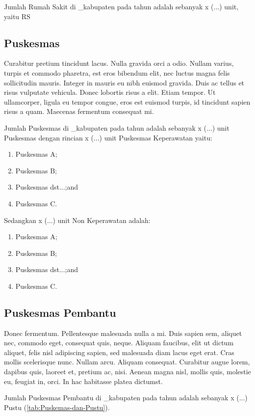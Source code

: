 Jumlah Rumah Sakit di \nama_kabupaten pada tahun \tP adalah
sebanyak x (...) unit, yaitu RS

\subsection{Puskesmas}
Curabitur pretium tincidunt lacus. Nulla gravida orci a odio. Nullam varius, turpis et commodo pharetra, est eros bibendum elit, nec luctus magna felis sollicitudin mauris. Integer in mauris eu nibh euismod gravida. Duis ac tellus et risus vulputate vehicula. Donec lobortis risus a elit. Etiam tempor. Ut ullamcorper, ligula eu tempor congue, eros est euismod turpis, id tincidunt sapien risus a quam. Maecenas fermentum consequat mi.

Jumlah Puskesmas di \nama_kabupaten pada tahun
\tP adalah sebanyak x (...) unit Puskesmas dengan rincian x (...)
unit Puskesmas Keperawatan yaitu:
\begin{enumerate}
  \item Puskesmas A;
  \item Puskesmas B;
  \item Puskesmas dst...;and
  \item Puskesmas C.
\end{enumerate}
Sedangkan x (...) unit Non Keperawatan adalah:
\begin{enumerate}
  \item Puskesmas A;
  \item Puskesmas B;
  \item Puskesmas dst...;and
  \item Puskesmas C.
\end{enumerate}

\subsection{Puskesmas Pembantu}

Donec fermentum. Pellentesque malesuada nulla a mi. Duis sapien sem, aliquet nec, commodo eget, consequat quis, neque. Aliquam faucibus, elit ut dictum aliquet, felis nisl adipiscing sapien, sed malesuada diam lacus eget erat. Cras mollis scelerisque nunc. Nullam arcu. Aliquam consequat. Curabitur augue lorem, dapibus quis, laoreet et, pretium ac, nisi. Aenean magna nisl, mollis quis, molestie eu, feugiat in, orci. In hac habitasse platea dictumst.

Jumlah Puskesmas Pembantu di \nama_kabupaten pada tahun \tP
adalah sebanyak x (...) Pustu (\autoref{tab:Puskemas-dan-Pustu}).

